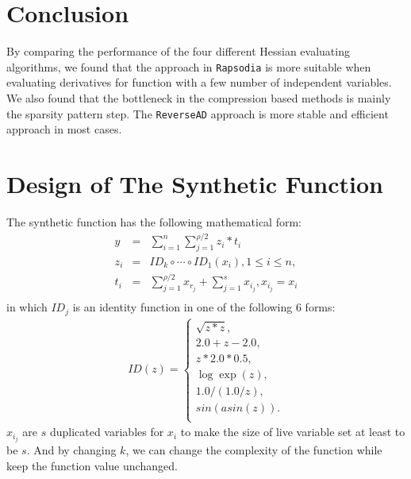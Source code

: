 \documentclass[final,leqno,onefignum,onetabnum]{siamart}
\begin{document}
\section*{Conclusion}
By comparing the performance of the four different Hessian evaluating algorithms, we found that the approach in {\tt Rapsodia} is more suitable when evaluating derivatives for function with a few number of independent variables. We also found that the bottleneck in the compression based methods is mainly the sparsity pattern step. 
The {\tt ReverseAD} approach is more stable and efficient approach in most cases. 

\appendix
\section{Design of The Synthetic Function}
The synthetic function has the following mathematical form:
\begin{eqnarray*}
y &=& \sum\limits_{i=1}^{n} \sum\limits_{j=1}^{\rho/2} z_i * t_i \\ 
z_i &=& ID_k \circ \cdots \circ ID_1 (x_i), 1 \le i \le n, \\
t_i &=& \sum\limits_{j=1}^{\rho/2} x_{r_j} + \sum\limits_{j=1}^{s} x_{i_j}, x_{i_j} = x_i \\
\end{eqnarray*}
in which $ID_j$ is an identity function in one of the following $6$ forms:
\begin{eqnarray*}
ID(z) = 
\begin{cases}
\sqrt{z * z}, \\
2.0 + z - 2.0, \\
z * 2.0 * 0.5, \\
\log \exp(z), \\
1.0 / (1.0 / z), \\
sin(asin(z)). \\
\end{cases}
\end{eqnarray*}
$x_{i_j}$ are $s$ duplicated variables for $x_i$ to make the size of live variable set at least to be $s$. And by changing $k$, we can change the complexity of the function while keep the function value unchanged.




\end{document}
